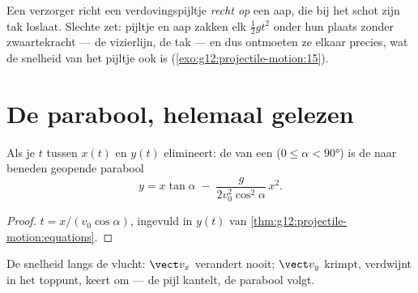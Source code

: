 \begin{remark}\label{rem:g12:projectile-motion:monkey}
Een verzorger richt een verdovingspijltje \emph{recht op} een aap, die bij
het schot zijn tak loslaat. Slechte zet: pijltje en aap zakken elk
$\tfrac12 gt^2$ onder hun plaats zonder zwaartekracht --- de vizierlijn, de
tak --- en dus ontmoeten ze elkaar precies, wat de snelheid van het pijltje
ook is (\cref{exo:g12:projectile-motion:15}).
\end{remark}

\section{De parabool, helemaal gelezen}

\begin{theorem}[Baan]\label{thm:g12:projectile-motion:trajectory}
Als je $t$ tussen $x(t)$ en $y(t)$ elimineert: de  van een 
($0 \leq \alpha < \ang{90}$) is de naar beneden geopende parabool
\[
y = x\tan\alpha \;-\; \frac{g}{2 v_0^2 \cos^2\alpha}\, x^2 .
\]
\end{theorem}

\begin{proof}
$t = x/(v_0\cos\alpha)$, ingevuld in $y(t)$ van
\cref{thm:g12:projectile-motion:equations}.
\end{proof}

\begin{omfigure}

{\small De snelheid langs de vlucht: $\vect v_x$ verandert nooit;
$\vect v_y$ krimpt, verdwijnt in het toppunt, keert om --- de pijl kantelt,
de parabool volgt.}
\end{omfigure}

